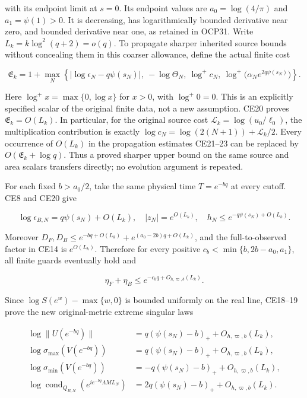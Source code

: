 \documentclass[10pt]{article}
\begin{document}
with its endpoint limit at \(s=0\). Its endpoint values are \(a_0=\log(4/\pi)\) and \(a_1=\psi(1)>0\). It is decreasing, has logarithmically bounded derivative near zero, and bounded derivative near one, as retained in OCP31. Write \(L_k=k\log^2(q+2)=o(q)\). To propagate sharper inherited source bounds without concealing them in this coarser allowance, define the actual finite cost

\[
\mathfrak E_k=1+\max_N\left\{
|\log\epsilon_N-q\psi(s_N)|,\ -\log\Theta_N,\ \log^+c_N,
\ \log^+\bigl(\alpha_Ne^{2q\psi(s_N)}\bigr)\right\}. \tag{CE20a}
\]

Here \(\log^+x=\max\{0,\log x\}\) for \(x>0\), with \(\log^+0=0\). This is an explicitly specified scalar of the original finite data, not a new assumption. CE20 proves \(\mathfrak E_k=O(L_k)\). In particular, for the original source cost \(\mathcal L_k=\log(u_0/\ell_0)\), the multiplication contribution is exactly \(\log c_N=\log(2(N+1))+\mathcal L_k/2\). Every occurrence of \(O(L_k)\) in the propagation estimates CE21--23 can be replaced by \(O(\mathfrak E_k+\log q)\). Thus a proved sharper upper bound on the same source and area scalars transfers directly; no evolution argument is repeated.

For each fixed \(b>a_0/2\), take the same physical time \(T=e^{-bq}\) at every cutoff. CE8 and CE20 give

\[
\log\epsilon_{B,N}=q\psi(s_N)+O(L_k),\quad
|z_N|=e^{O(L_k)},\quad h_N\le e^{-q\psi(s_N)+O(L_k)}.
\]

Moreover \(D_F,D_B\le e^{-bq+O(L_k)}+e^{(a_0-2b)q+O(L_k)}\), and the full-to-observed factor in CE14 is \(e^{O(L_k)}\). Therefore for every positive \(c_b<\min\{b,2b-a_0,a_1\}\), all finite guards eventually hold and

\[
\eta_F+\eta_B\le e^{-c_bq+O_{h,\varpi,b}(L_k)}. \tag{CE21}
\]

Since \(\log S(e^w)-\max\{w,0\}\) is bounded uniformly on the real line, CE18--19 prove the new original-metric extreme singular laws

\[
\begin{aligned}
\log\|U(e^{-bq})\|&=q(\psi(s_N)-b)_++O_{h,\varpi,b}(L_k),\\
\log\sigma_{\max}(V(e^{-bq}))&=q(\psi(s_N)-b)_++O_{h,\varpi,b}(L_k),\\
\log\sigma_{\min}(V(e^{-bq}))&=-q(\psi(s_N)-b)_++O_{h,\varpi,b}(L_k),\\
\log\operatorname{cond}_{Q_{B,N}}(e^{ie^{-bq}\Lambda ML_N})
&=2q(\psi(s_N)-b)_++O_{h,\varpi,b}(L_k).
\end{aligned} \tag{CE22}
\]
\end{document}

